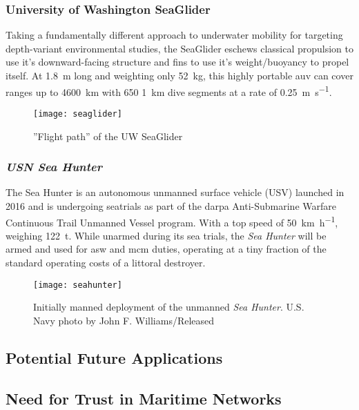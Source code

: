 \subsubsection{University of Washington SeaGlider}
Taking a fundamentally different approach to underwater mobility for targeting depth-variant environmental studies, the SeaGlider eschews classical propulsion to use it's downward-facing structure and fins to use it's weight/buoyancy to propel itself.   
At \SI{1.8}{\meter} long and weighting only \SI{52}{\kilogram}, this highly portable \gls{auv} can cover ranges up to \SI{4600}{\kilo\meter} with 650 \SI{1}{\kilo\meter} dive segments at a rate of \SI{0.25}{\meter\per\second}.
\begin{figure}[h]
	\centering
	\texttt{[image: seaglider]}
	\caption{\label{fig:seaglider}''Flight path'' of the UW SeaGlider}
\end{figure}
\subsubsection{\emph{USN Sea Hunter}}
The Sea Hunter is an autonomous unmanned surface vehicle (USV) launched in 2016 and is undergoing seatrials as part of the \gls{darpa} Anti-Submarine Warfare Continuous Trail Unmanned Vessel program. With a top speed of \SI{50}{\km\per\hour}, weighing \SI{122}{\tonne}.
While unarmed during its sea trials, the \emph{Sea Hunter} will be armed and used for \gls{asw} and \gls{mcm} duties, operating at a tiny fraction of the standard operating costs of a littoral destroyer.
\begin{figure}[h]
	\centering
	\texttt{[image: seahunter]}
	\caption{\label{fig:seaglider}Initially manned deployment of the unmanned \emph{Sea Hunter}. U.S. Navy photo by John F. Williams/Released}
\end{figure}

\subsection{Potential Future Applications}

\subsection{Need for Trust in Maritime Networks}\label{sec:trust_in_marine}


